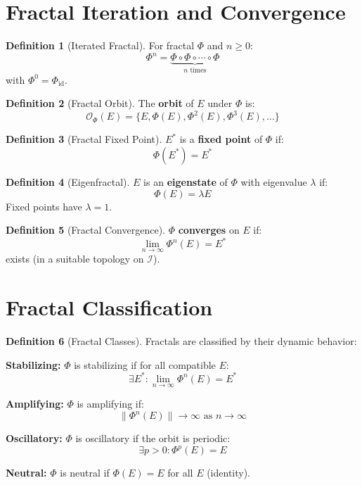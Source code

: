 \documentclass[11pt,twoside,openright]{book}
\theoremstyle{definition}
\newtheorem{definition}{Definition}[chapter]
\theoremstyle{plain}
\theoremstyle{remark}
\newcommand{\Ideas}{\mathcal{I}}
\newcommand{\Frac}{\Phi}
\newcommand{\id}{\mathrm{id}}
\begin{document}
\section{Fractal Iteration and Convergence}

\begin{definition}[Iterated Fractal]
\label{def:iterated-fractal}
For fractal $\Frac$ and $n \geq 0$:
\[
\Frac^n = \underbrace{\Frac \circ \Frac \circ \cdots \circ \Frac}_{n \text{ times}}
\]
with $\Frac^0 = \Frac_{\id}$.
\end{definition}

\begin{definition}[Fractal Orbit]
\label{def:fractal-orbit}
The \textbf{orbit} of $E$ under $\Frac$ is:
\[
\mathcal{O}_\Frac(E) = \{E, \Frac(E), \Frac^2(E), \Frac^3(E), \ldots\}
\]
\end{definition}

\begin{definition}[Fractal Fixed Point]
\label{def:fractal-fixpoint}
$E^*$ is a \textbf{fixed point} of $\Frac$ if:
\[
\Frac(E^*) = E^*
\]
\end{definition}

\begin{definition}[Eigenfractal]
\label{def:eigenfractal}
$E$ is an \textbf{eigenstate} of $\Frac$ with eigenvalue $\lambda$ if:
\[
\Frac(E) = \lambda E
\]
Fixed points have $\lambda = 1$.
\end{definition}

\begin{definition}[Fractal Convergence]
\label{def:fractal-convergence}
$\Frac$ \textbf{converges} on $E$ if:
\[
\lim_{n \to \infty} \Frac^n(E) = E^*
\]
exists (in a suitable topology on $\Ideas$).
\end{definition}

\section{Fractal Classification}

\begin{definition}[Fractal Classes]
\label{def:fractal-classes}
Fractals are classified by their dynamic behavior:

\textbf{Stabilizing:} $\Frac$ is stabilizing if for all compatible $E$:
\[
\exists E^* : \lim_{n \to \infty} \Frac^n(E) = E^*
\]

\textbf{Amplifying:} $\Frac$ is amplifying if:
\[
\|\Frac^n(E)\| \to \infty \text{ as } n \to \infty
\]

\textbf{Oscillatory:} $\Frac$ is oscillatory if the orbit is periodic:
\[
\exists p > 0 : \Frac^p(E) = E
\]

\textbf{Neutral:} $\Frac$ is neutral if $\Frac(E) = E$ for all $E$ (identity).
\end{definition}
\end{document}
